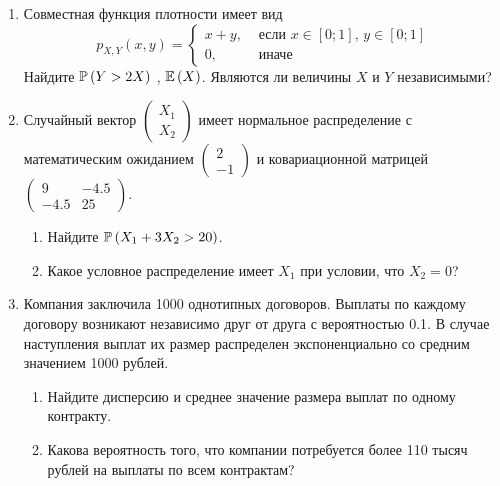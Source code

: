 \begin{enumerate}
\item Совместная функция плотности имеет вид
\[
p_{X,Y} \left(x,y\right)=
\begin{cases}
x+y, & \text{ если } x\in \left[0;1\right],\, y\in \left[0;1\right] \\
0, & \text{ иначе}
\end{cases}
\]
Найдите  $\P\left(Y>2X\right)$ ,  $\E\left(X\right)$.
Являются ли величины $X$ и $Y$ независимыми?
\item Случайный вектор  $\left(\begin{array}{c}
{X_{1} } \\ {X_{2} }
\end{array}\right)$  имеет нормальное распределение с
математическим ожиданием  $\left(\begin{array}{c} {2} \\ {-1}
\end{array}\right)$  и ковариационной матрицей
$\left(\begin{array}{cc} {9} & {-4.5} \\ {-4.5} & {25}
\end{array}\right)$.
\begin{enumerate}
\item Найдите  $\P\left(X_{1} +3X_{2} >20\right)$.
\item Какое условное распределение имеет $X_{1}$ при условии, что $X_{2}=0$?
\end{enumerate}

\item Компания заключила 1000 однотипных договоров. Выплаты по каждому договору возникают независимо друг от друга с вероятностью 0.1. В случае наступления выплат их размер распределен экспоненциально со средним значением 1000 рублей.
\begin{enumerate}
\item Найдите дисперсию и среднее значение размера выплат по одному контракту.
\item Какова вероятность того, что компании потребуется более 110 тысяч рублей на выплаты по всем контрактам?
\end{enumerate}


\end{enumerate}
